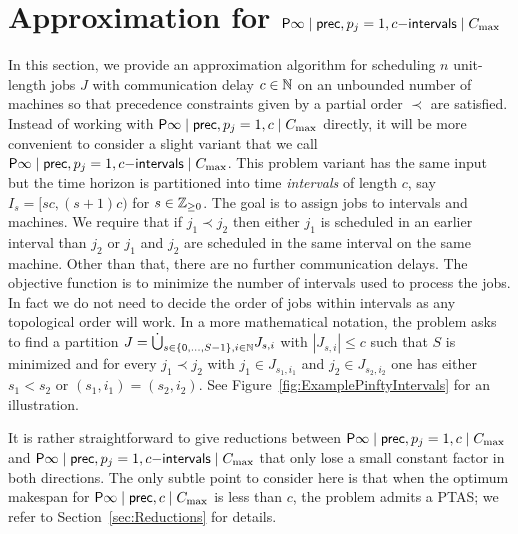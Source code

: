 







\section{Approximation for  $\mathsf{P} \infty \mid \mathsf{prec}, p_j=1, c\mathsf{-intervals} \mid C_{\max}$}
\label{sec:approximation_for_pinfty}

In this section, we provide an approximation algorithm for scheduling $n$ unit-length jobs $J$ with
communication delay $c \in \mathbb{N}$ on an unbounded number of machines so that precedence constraints given
by a partial order $\prec$ are satisfied. Instead of working with  $\mathsf{P} \infty \mid \mathsf{prec}, p_j=1, c \mid C_{\max}$ directly, it will be
more convenient to consider a slight variant that we call $\mathsf{P} \infty \mid \mathsf{prec}, p_j=1, c\mathsf{-intervals} \mid C_{\max}$.
This problem variant has the same input but the time horizon is partitioned into time {\em intervals} of length $c$,
say $I_s = [sc, (s+1)c)$ for $s \in \mathbb{Z}_{\geq 0}$.
The goal is to assign jobs to intervals and machines. %
We require that if $j_1 \prec j_2$
then either $j_1$ is scheduled in an earlier interval than $j_2$ or $j_1$ and $j_2$ are scheduled in the same
interval on the same machine. Other than that, there are no further communication delays.
The objective function is to minimize the number of intervals used to process the jobs.
In fact we do not need to decide the order of jobs within intervals as any topological order will work.
In a more mathematical notation, the problem asks to find a partition $J = \dot{\bigcup}_{s \in \{0,\ldots,S-1\},i \in \mathbb{N}} J_{s,i}$
with $|J_{s,i}| \leq c$ such that $S$ is minimized and for every $j_1 \prec j_2$ with $j_1 \in J_{s_1,i_1}$ and  $j_2 \in J_{s_2,i_2}$
one has either $s_1<s_2$ or $(s_1,i_1)=(s_2,i_2)$.
See Figure~\ref{fig:ExamplePinftyIntervals} for an illustration.

It is rather straightforward to give reductions between $\mathsf{P} \infty \mid \mathsf{prec}, p_j=1, c \mid C_{\max}$ and $\mathsf{P} \infty \mid \mathsf{prec}, p_j=1, c\mathsf{-intervals} \mid C_{\max}$ that only lose a small constant factor in both directions. The only subtle point to consider here
is that when the optimum makespan for $\mathsf{P} \infty \mid \mathsf{prec}, c \mid C_{\max}$ is less than $c$, the problem admits a PTAS;
we refer to Section~\ref{sec:Reductions} for details. 


